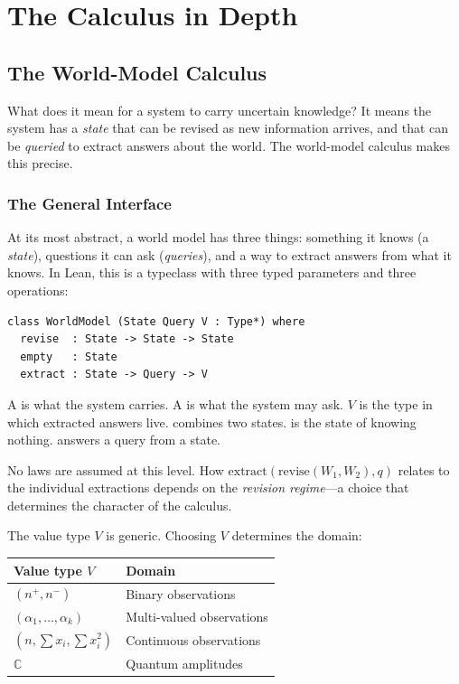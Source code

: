 \documentclass[11pt,openany]{report}
\begin{document}
\part{The Calculus in Depth}
\label{part:calculus}

\chapter{The World-Model Calculus}
\label{ch:world-models}

What does it mean for a system to carry uncertain knowledge?  It means
the system has a \emph{state} that can be revised as new information
arrives, and that can be \emph{queried} to extract answers about the
world.  The world-model calculus makes this precise.

\section{The General Interface}

At its most abstract, a world model has three things: something it
knows (a \emph{state}), questions it can ask (\emph{queries}), and a
way to extract answers from what it knows.  In Lean, this is a
typeclass with three typed parameters and three operations:

\begin{lstlisting}[language={}]
class WorldModel (State Query V : Type*) where
  revise  : State -> State -> State
  empty   : State
  extract : State -> Query -> V
\end{lstlisting}

\noindent
A  is what the system carries.  A  is what
the system may ask.  $V$ is the type in which extracted answers live.
 combines two states.   is the state of
knowing nothing.   answers a query from a state.

No laws are assumed at this level.  How
$\mathrm{extract}(\mathrm{revise}(W_1, W_2), q)$
relates to the individual extractions depends on the \emph{revision
regime}---a choice that determines the character of the calculus.

The value type $V$ is generic.  Choosing $V$ determines the domain:

\medskip
\begin{center}
\begin{tabular}{ll}
\toprule
\textbf{Value type $V$} & \textbf{Domain} \\
\midrule
$(n^+, n^-)$ & Binary observations \\
$(\alpha_1,\ldots,\alpha_k)$ & Multi-valued observations \\
$(n, \textstyle\sum x_i, \sum x_i^2)$ & Continuous observations \\
$\mathbb{C}$ & Quantum amplitudes \\
\bottomrule
\end{tabular}
\end{center}
\medskip
\end{document}
